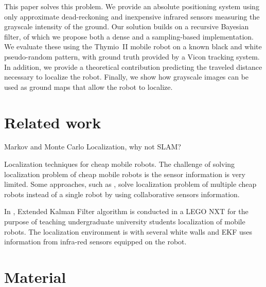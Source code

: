 \documentclass[letterpaper, 10pt, conference]{ieeeconf}
\begin{document}
This paper solves this problem.
We provide an absolute positioning system using only approximate dead-reckoning and inexpensive infrared sensors measuring the grayscale intensity of the ground.
Our solution builds on a recursive Bayesian filter, of which we propose both a dense and a sampling-based implementation.
We evaluate these using the Thymio~II mobile robot on a known black and white pseudo-random pattern, with ground truth provided by a Vicon tracking system.
In addition, we provide a theoretical contribution predicting the traveled distance necessary to localize the robot.
Finally, we show how grayscale images can be used as ground maps that allow the robot to localize.

\section{Related work}

Markov and Monte Carlo Localization, why not SLAM?

Localization techniques for cheap mobile robots.
The challenge of solving localization problem of cheap mobile robots is the sensor information is very limited.
Some approaches, such as \cite{prorok2012low, dias2013absolute}, solve localization problem of multiple cheap robots instead of a single robot by using collaborative sensors information.

In \cite{pinto2012localization}, Extended Kalman Filter algorithm is conducted in a LEGO NXT for the purpose of teaching undergraduate university students localization of mobile robots.
The localization environment is with several white walls and EKF uses information from infra-red sensors equipped on the robot.


\section{Material}
\end{document}
